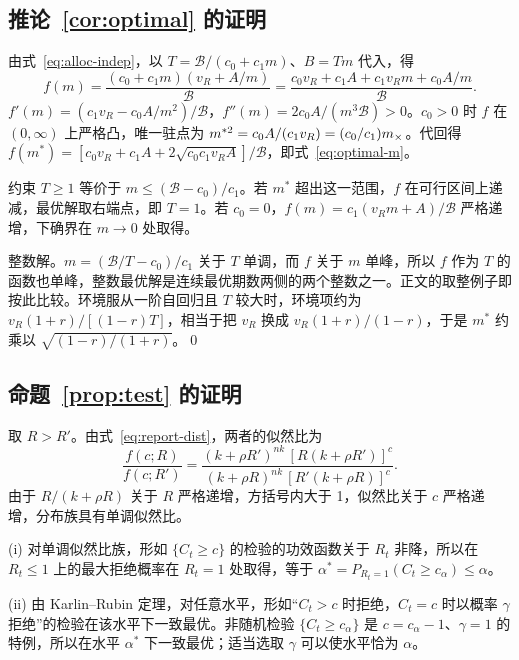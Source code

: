\subsection{\texorpdfstring{推论~\ref{cor:optimal} 的证明}{推论 1 的证明}}

由式~\eqref{eq:alloc-indep}，以 $T=\mathcal B/(c_0+c_1m)$、$B=Tm$ 代入，得
\begin{equation*}
  f(m)=\frac{(c_0+c_1m)(v_R+A/m)}{\mathcal B}=\frac{c_0v_R+c_1A+c_1v_Rm+c_0A/m}{\mathcal B}.
\end{equation*}
$f'(m)=(c_1v_R-c_0A/m^2)/\mathcal B$，$f''(m)=2c_0A/(m^3\mathcal B)>0$。$c_0>0$ 时 $f$ 在 $(0,\infty)$ 上严格凸，唯一驻点为 $m^{*2}=c_0A/(c_1v_R)=(c_0/c_1)m_{\times}$。代回得 $f(m^*)=[c_0v_R+c_1A+2\sqrt{c_0c_1v_RA}]/\mathcal B$，即式~\eqref{eq:optimal-m}。

约束 $T\geq1$ 等价于 $m\leq(\mathcal B-c_0)/c_1$。若 $m^*$ 超出这一范围，$f$ 在可行区间上递减，最优解取右端点，即 $T=1$。若 $c_0=0$，$f(m)=c_1(v_Rm+A)/\mathcal B$ 严格递增，下确界在 $m\to0$ 处取得。

整数解。$m=(\mathcal B/T-c_0)/c_1$ 关于 $T$ 单调，而 $f$ 关于 $m$ 单峰，所以 $f$ 作为 $T$ 的函数也单峰，整数最优解是连续最优期数两侧的两个整数之一。正文的取整例子即按此比较。环境服从一阶自回归且 $T$ 较大时，环境项约为 $v_R(1+r)/[(1-r)T]$，相当于把 $v_R$ 换成 $v_R(1+r)/(1-r)$，于是 $m^*$ 约乘以 $\sqrt{(1-r)/(1+r)}$。\qed

\subsection{\texorpdfstring{命题~\ref{prop:test} 的证明}{命题 5 的证明}}

取 $R>R'$。由式~\eqref{eq:report-dist}，两者的似然比为
\begin{equation*}
  \frac{f(c;R)}{f(c;R')}=\frac{(k+\rho R')^{nk}\,[R(k+\rho R')]^{c}}{(k+\rho R)^{nk}\,[R'(k+\rho R)]^{c}}.
\end{equation*}
由于 $R/(k+\rho R)$ 关于 $R$ 严格递增，方括号内大于 1，似然比关于 $c$ 严格递增，分布族具有单调似然比。

(i) 对单调似然比族，形如 $\{C_t\geq c\}$ 的检验的功效函数关于 $R_t$ 非降\citep{lehmann2005testing}，所以在 $R_t\leq1$ 上的最大拒绝概率在 $R_t=1$ 处取得，等于 $\alpha^*=P_{R_t=1}(C_t\geq c_\alpha)\leq\alpha$。

(ii) 由 Karlin--Rubin 定理\citep{karlin1956theory}，对任意水平，形如“$C_t>c$ 时拒绝，$C_t=c$ 时以概率 $\gamma$ 拒绝”的检验在该水平下一致最优。非随机检验 $\{C_t\geq c_\alpha\}$ 是 $c=c_\alpha-1$、$\gamma=1$ 的特例，所以在水平 $\alpha^*$ 下一致最优；适当选取 $\gamma$ 可以使水平恰为 $\alpha$。

